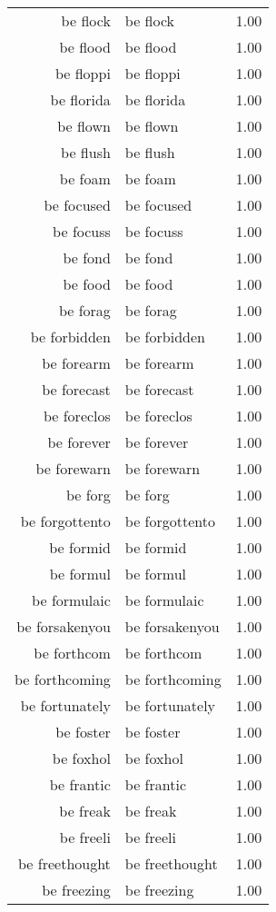 \begin{table}[ht]
\begin{tabular}{rlr}
  be flock & be flock & 1.00 \\ 
  be flood & be flood & 1.00 \\ 
  be floppi & be floppi & 1.00 \\ 
  be florida & be florida & 1.00 \\ 
  be flown & be flown & 1.00 \\ 
  be flush & be flush & 1.00 \\ 
  be foam & be foam & 1.00 \\ 
  be focused & be focused & 1.00 \\ 
  be focuss & be focuss & 1.00 \\ 
  be fond & be fond & 1.00 \\ 
  be food & be food & 1.00 \\ 
  be forag & be forag & 1.00 \\ 
  be forbidden & be forbidden & 1.00 \\ 
  be forearm & be forearm & 1.00 \\ 
  be forecast & be forecast & 1.00 \\ 
  be foreclos & be foreclos & 1.00 \\ 
  be forever & be forever & 1.00 \\ 
  be forewarn & be forewarn & 1.00 \\ 
  be forg & be forg & 1.00 \\ 
  be forgottento & be forgottento & 1.00 \\ 
  be formid & be formid & 1.00 \\ 
  be formul & be formul & 1.00 \\ 
  be formulaic & be formulaic & 1.00 \\ 
  be forsakenyou & be forsakenyou & 1.00 \\ 
  be forthcom & be forthcom & 1.00 \\ 
  be forthcoming & be forthcoming & 1.00 \\ 
  be fortunately & be fortunately & 1.00 \\ 
  be foster & be foster & 1.00 \\ 
  be foxhol & be foxhol & 1.00 \\ 
  be frantic & be frantic & 1.00 \\ 
  be freak & be freak & 1.00 \\ 
  be freeli & be freeli & 1.00 \\ 
  be freethought & be freethought & 1.00 \\ 
  be freezing & be freezing & 1.00 \\ 

\end{tabular}
\end{table}
